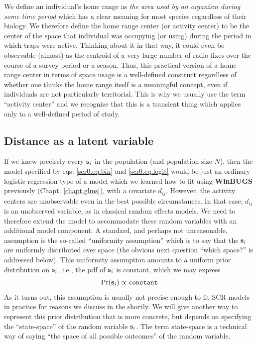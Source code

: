 We define an individual's home range as {\it the area used by an
  organism during some time period} which has a clear meaning for most
species regardless of their biology.
We therefore define the
home range center (or activity center) to be the center of the space that individual
was occupying (or using) during the period in which traps were
active. Thinking about it in that way, it could even be observable
(almost) as the centroid of a very large number of radio fixes over
the course of a survey period or a season.  Thus, this practical
version of a home range center in terms of space usage is a
well-defined construct regardless of whether one thinks the home range
itself is a meaningful concept, even if individuals are not
particularly territorial.  This is why we usually use the term
``activity center'' and we recognize that this is a transient thing
which applies only to a well-defined period of study.


\subsection{Distance as a latent variable}

If we knew precisely every ${\bf s}_{i}$ in the population (and
population size $N$), then the model specified by
eqs. \ref{scr0.eq.bin} and \ref{scr0.eq.logit} would be just an
ordinary logistic regression-type of a model which we learned how to
fit using {\bf WinBUGS} previously (Chapt. \ref{chapt.glms}), with a
covariate $d_{ij}$. However, the activity centers are unobservable
even in the best possible circumstances. In that case, $d_{ij}$ is an
unobserved variable, as in classical random effects models. We need to
therefore extend the model to accommodate these random variables with
an additional model component. A standard, and perhaps not
unreasonable, assumption is the so-called ``uniformity assumption''
which is to say that the ${\bf s}_{i}$ are uniformly distributed over
space (the obvious next question ``which space?'' is addressed below).
This uniformity assumption amounts to a uniform prior distribution on
${\bf s}_{i}$, i.e., the pdf of ${\bf s}_{i}$ is constant, which we
may express
\begin{equation}
	\Pr({\bf s}_{i}) \propto \mbox{\tt constant} %
\label{scr0.eq.sprior}
\end{equation}
 As it turns out, this assumption is usually not precise
enough to fit SCR models in practice for reasons we discuss in the
shortly.  We will give another way to represent this prior
distribution that is more concrete, but depends on specifying the
``state-space'' of the random variable ${\bf s}_{i}$. The term
state-space is a technical way of saying ``the space of all possible
outcomes'' of the random variable.

